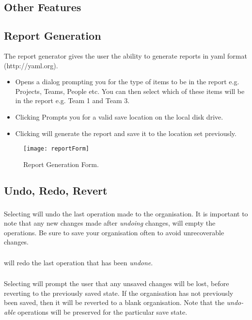 \documentclass[11pt,fleqn]{book} %
\begin{document}
\begin{enumerate}
\chapter{Other Features}
\section{Report Generation}
The report generator gives the user the ability to generate reports in yaml format (http://yaml.org).
\begin{itemize}
  \item {} Opens a dialog prompting you for the type of items to be in the report
  e.g. Projects, Teams, People etc. You can then select which of these items will be in the report e.g. Team 1 and
  Team 3.
  \item Clicking  Prompts you for a valid save location on the local disk drive.
  \item Clicking  will generate the report and save it to the location set previously.
\end{itemize}

\begin{figure}[H]
  \centering
  \texttt{[image: reportForm]}
  \caption{Report Generation Form.\label{reportForm}}
\end{figure}

\section{Undo, Redo, Revert}
\paragraph{}
Selecting  will undo the last operation made to the organisation. It is important to note that any
new changes made after \textit{undoing} changes, will empty the  operations. Be sure to save
your organisation often to avoid unrecoverable changes.

\paragraph{}
 will redo the last operation that has been \textit{undone}.

\paragraph{}
Selecting  will prompt the user that any unsaved changes will be lost, before reverting
to the previously saved state. If the organisation has not previously been saved, then it will be reverted
to a blank organisation. Note that the \textit{undo-able} operations will be preserved for the particular save state.


\end{enumerate}
\end{document}
